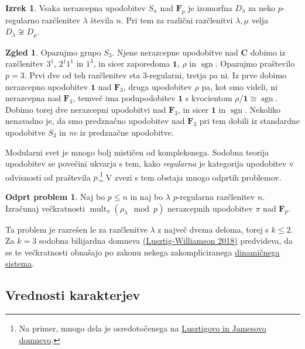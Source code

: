 \documentclass[11pt]{book}
\def\CC{\mathbf{C}}
\def\11{\mathbf{1}}
\def\FF{\mathbf{F}}
\DeclareMathOperator\sgn{sgn}
\DeclareMathOperator\mult{mult}
\theoremstyle{definition}
\theoremstyle{zgled}
\newtheorem*{zgled}{Zgled}
\theoremstyle{odprtproblem}
\newtheorem*{odprtproblem}{Odprt problem}
\theoremstyle{domacanaloga}
\theoremstyle{izrek}
\newtheorem*{izrek}{Izrek}
\begin{document}
\begin{izrek}
    Vsaka nerazcepna upodobitev $S_n$ nad $\FF_p$ je izomorfna $D_{\lambda}$ za neko $p$-regularno razčlenitev $\lambda$ števila $n$. Pri tem za različni razčlenitvi $\lambda , \mu$ velja $D_{\lambda} \not\cong D_{\mu}$.
\end{izrek}

\begin{zgled}
Opazujmo grupo $S_3$. Njene nerazcepne upodobitve nad $\CC$ dobimo iz razčlenitev $3^1$, $2^1 1^1$ in $1^3$, in sicer zaporedoma $\11$, $\rho$ in $\sgn$. Opazujmo praštevilo $p = 3$. Prvi dve od teh razčlenitev sta $3$-regularni, tretja pa ni. Iz prve dobimo nerazcepno upodobitev $\11$ nad $\FF_3$, druga upodobitev $\rho$ pa, kot smo videli, ni nerazcepna nad $\FF_3$, temveč ima podupodobitev $\11$ s kvocientom $\rho / \11 \cong \sgn$. Dobimo torej dve nerazcepni upodobitvi nad $\FF_3$, in sicer $\11$ in $\sgn$. Nekoliko nenavadno je, da smo predznačno upodobitev nad $\FF_3$ pri tem dobili iz standardne upodobitve $S_3$ in \emph{ne} iz predznačne upodobitve.
\end{zgled}

Modularni svet je mnogo bolj mističen od kompleksnega. Sodobna teorija upodobitev se povečini ukvarja s tem, kako \emph{regularna} je kategorija upodobitev v odvisnosti od praštevila $p$.\footnote{Na primer, mnogo dela je osredotočenega na \href{https://mathoverflow.net/questions/138310/what-to-do-now-that-lusztigs-and-james-conjectures-have-been-shown-to-be-false}{Lusztigovo in Jamesovo domnevo}.} V zvezi s tem obstaja mnogo odprtih problemov.

\begin{odprtproblem}
Naj bo $p \leq n$ in naj bo $\lambda$ $p$-regularna razčlenitev $n$. Izračunaj večkratnosti $\mult_{\pi}(\rho_{\lambda} \mod{p})$ nerazcepnih upodobitev $\pi$ nad $\FF_p$.
\end{odprtproblem}

Ta problem je razrešen le za razčlenitve $\lambda$ z največ dvema deloma, torej s $k \leq 2$. Za $k = 3$ sodobna bilijardna domneva \href{https://arxiv.org/pdf/1703.05898.pdf}{(Lusztig-Williamson 2018)} predvideva, da se te večkratnosti obnašajo po zakonu nekega zakompliciranega \href{https://www.youtube.com/watch?v=Ru0Zys1Vvq4}{dinamičnega sistema}.

\subsection{Vrednosti karakterjev}
\end{document}
